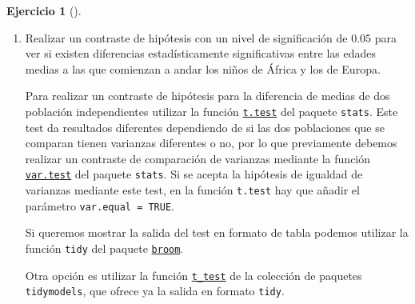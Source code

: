 \documentclass[
  a4paper,
]{scrreport}
\theoremstyle{definition}
\newtheorem{exercise}{Ejercicio}[chapter]
\theoremstyle{remark}
\begin{document}
\begin{exercise}[]
\begin{enumerate}
\begin{tcolorbox}
  \end{tcolorbox}
\item
  Realizar un contraste de hipótesis con un nivel de significación de
  \(0.05\) para ver si existen diferencias estadísticamente
  significativas entre las edades medias a las que comienzan a andar los
  niños de África y los de Europa.

  \begin{tcolorbox}[enhanced jigsaw, breakable, toptitle=1mm, colbacktitle=quarto-callout-note-color!10!white, rightrule=.15mm, opacityback=0, opacitybacktitle=0.6, titlerule=0mm, coltitle=black, colframe=quarto-callout-note-color-frame, colback=white, bottomtitle=1mm, leftrule=.75mm, toprule=.15mm, title=\textcolor{quarto-callout-note-color}{\faInfo}\hspace{0.5em}{Ayuda}, arc=.35mm, bottomrule=.15mm, left=2mm]

  Para realizar un contraste de hipótesis para la diferencia de medias
  de dos población independientes utilizar la función
  \href{https://www.rdocumentation.org/packages/stats/versions/3.6.2/topics/t.test}{\texttt{t.test}}
  del paquete \texttt{stats}. Este test da resultados diferentes
  dependiendo de si las dos poblaciones que se comparan tienen varianzas
  diferentes o no, por lo que previamente debemos realizar un contraste
  de comparación de varianzas mediante la función
  \href{https://www.rdocumentation.org/packages/stats/versions/3.6.2/topics/var.test}{\texttt{var.test}}
  del paquete \texttt{stats}. Si se acepta la hipótesis de igualdad de
  varianzas mediante este test, en la función \texttt{t.test} hay que
  añadir el parámetro \texttt{var.equal\ =\ TRUE}.

  Si queremos mostrar la salida del test en formato de tabla podemos
  utilizar la función \texttt{tidy} del paquete
  \href{https://broom.tidymodels.org/index.html}{\texttt{broom}}.

  Otra opción es utilizar la función
  \href{https://infer.tidymodels.org/reference/t_test.html}{\texttt{t\_test}}
  de la colección de paquetes \texttt{tidymodels}, que ofrece ya la
  salida en formato \texttt{tidy}.

  \end{tcolorbox}

  \begin{tcolorbox}[enhanced jigsaw, breakable, toptitle=1mm, colbacktitle=quarto-callout-tip-color!10!white, rightrule=.15mm, opacityback=0, opacitybacktitle=0.6, titlerule=0mm, coltitle=black, colframe=quarto-callout-tip-color-frame, colback=white, bottomtitle=1mm, leftrule=.75mm, toprule=.15mm, title=\textcolor{quarto-callout-tip-color}{\faLightbulb}\hspace{0.5em}{Solución}, arc=.35mm, bottomrule=.15mm, left=2mm]


\end{tcolorbox}
\end{enumerate}
\end{exercise}
\end{document}
